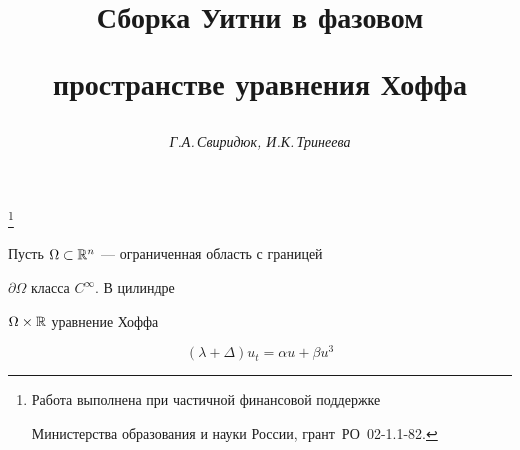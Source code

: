 

\setcounter{page}{54}















\author{\it Г.А.\,Свиридюк, И.К.\,Тринеева}




\title{Сборка Уитни в фазовом


пространстве уравнения Хоффа}


\thanks{Работа выполнена при частичной финансовой поддержке


Министерства образования и науки России, грант \No\,РО~02-1.1-82.}





\date{}




\pagestyle{plain} %







\maketitle


\label{begin}





\setcounter{section}{0}





Пусть $\Omega\subset{\Bbb R}^n$ --- ограниченная область с границей


$\partial \Omega$ класса $C^{\infty}$. В цилиндре


$\Omega\times\Bbb R$ уравнение Хоффа


\begin{equation}


(\lambda+\Delta)u_t=\alpha


u+\beta u^{3}


\end{equation}



